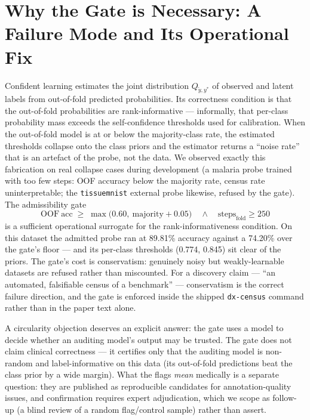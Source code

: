 \section{Why the Gate is Necessary: A Failure Mode and Its Operational Fix}
\label{sec:gatetheory}
Confident learning estimates the joint distribution $Q_{\tilde y, y^*}$
of observed and latent labels from out-of-fold predicted probabilities.
Its correctness condition is that the out-of-fold probabilities are
rank-informative --- informally, that per-class probability mass exceeds
the self-confidence thresholds used for calibration. When the out-of-fold
model is at or below the majority-class rate, the estimated thresholds
collapse onto the class priors and the estimator returns a ``noise rate''
that is an artefact of the probe, not the data. We observed exactly this
fabrication on real collapse cases during development (a malaria probe
trained with too few steps: OOF accuracy below the majority rate, census
rate uninterpretable; the \texttt{tissuemnist} external probe likewise,
refused by the gate). The admissibility gate
\begin{equation}
\mathrm{OOF\ acc} \;\ge\; \max\!\big(0.60,\ \mathrm{majority} + 0.05\big)
\quad\wedge\quad \mathrm{steps}_{\mathrm{fold}} \ge 250
\end{equation}
is a sufficient operational surrogate for the rank-informativeness
condition. On this dataset the admitted probe ran at 89.81\%%
accuracy against a 74.20\%%
over the gate's floor --- and its per-class thresholds (0.774, 0.845) sit
clear of the priors. The gate's cost is conservatism: genuinely noisy
but weakly-learnable datasets are refused rather than miscounted. For a
discovery claim --- ``an automated, falsifiable census of a benchmark''
--- conservatism
is the correct failure direction, and the gate is enforced inside the
shipped \texttt{dx-census} command rather than in the paper text alone.

A circularity objection deserves an explicit answer: the gate uses a model
to decide whether an auditing model's output may be trusted. The gate does
not claim clinical correctness --- it certifies only that the auditing
model is non-random and label-informative on this data (its out-of-fold
predictions beat the class prior by a wide margin). What the flags
\emph{mean} medically is a separate question: they are published as
reproducible candidates for annotation-quality issues, and confirmation
requires expert adjudication, which we scope as follow-up (a blind review
of a random flag/control sample) rather than assert.
